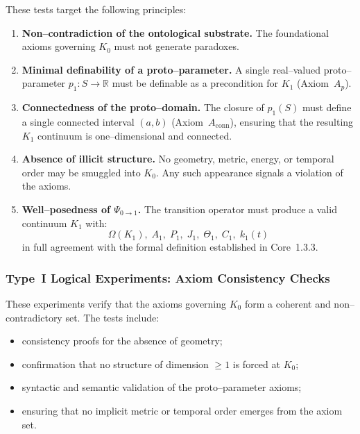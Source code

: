These tests target the following principles:

\begin{enumerate}
    \item \textbf{Non–contradiction of the ontological substrate.}  
          The foundational axioms governing $K_0$ must not generate paradoxes.

    \item \textbf{Minimal definability of a proto–parameter.}  
          A single real–valued proto–parameter $p_1: S\to\mathbb{R}$ must be
          definable as a precondition for $K_1$ (Axiom~$A_p$).

    \item \textbf{Connectedness of the proto–domain.}  
          The closure of $p_1(S)$ must define a single connected interval
          $(a,b)$ (Axiom~$A_{\mathrm{conn}}$), ensuring that the resulting
          $K_1$ continuum is one–dimensional and connected.

    \item \textbf{Absence of illicit structure.}  
          No geometry, metric, energy, or temporal order may be smuggled into
          $K_0$.  
          Any such appearance signals a violation of the axioms.

    \item \textbf{Well–posedness of $\Psi_{0\to 1}$.}  
          The transition operator must produce a valid continuum $K_1$ with:
          \[
             \Omega(K_1),\; A_1,\; P_1,\; J_1,\; \Theta_1,\; C_1,\; k_1(t)
          \]
          in full agreement with the formal definition established in
          Core~1.3.3.
\end{enumerate}


\subsubsection{Type~I Logical Experiments: Axiom Consistency Checks}

These experiments verify that the axioms governing $K_0$ form a coherent
and non–contradictory set.  
The tests include:

\begin{itemize}
    \item consistency proofs for the absence of geometry;
    \item confirmation that no structure of dimension $\ge 1$ is forced at $K_0$;
    \item syntactic and semantic validation of the proto–parameter axioms;
    \item ensuring that no implicit metric or temporal order emerges from
          the axiom set.
\end{itemize}

